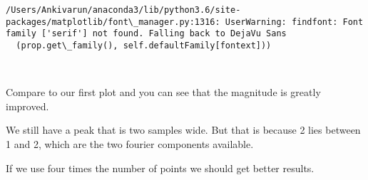 \documentclass[11pt]{article}
\begin{document}
    \begin{Verbatim}[commandchars=\\\{\}]
/Users/Ankivarun/anaconda3/lib/python3.6/site-packages/matplotlib/font\_manager.py:1316: UserWarning: findfont: Font family ['serif'] not found. Falling back to DejaVu Sans
  (prop.get\_family(), self.defaultFamily[fontext]))

    \end{Verbatim}

    \begin{center}
    \end{center}
    { \hspace*{\fill} \\}
    
    Compare to our first plot and you can see that the magnitude is greatly
improved.

We still have a peak that is two samples wide. But that is because 2
lies between 1 and 2, which are the two fourier components available.

If we use four times the number of points we should get better results.
\end{document}
